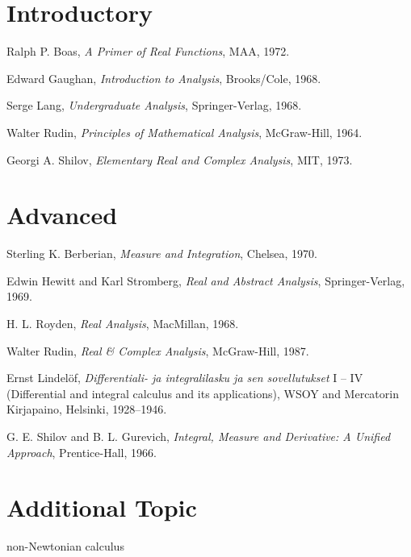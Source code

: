 \documentclass[12pt]{article}
\begin{document}
\section{Introductory}

Ralph P. Boas, {\em A Primer of Real Functions}, MAA, 1972.

Edward Gaughan, {\em Introduction to Analysis}, Brooks/Cole, 1968.

Serge Lang, {\em Undergraduate Analysis}, Springer-Verlag, 1968.

Walter Rudin, {\em Principles of Mathematical Analysis}, McGraw-Hill, 1964.

Georgi A. Shilov, {\em Elementary Real and Complex Analysis}, MIT, 1973.




\section{Advanced}

Sterling K. Berberian, {\em Measure and Integration}, Chelsea, 1970.

Edwin Hewitt and Karl Stromberg, {\em Real and Abstract Analysis}, Springer-Verlag, 1969.

H. L. Royden, {\em Real Analysis}, MacMillan, 1968.

Walter Rudin, {\em Real \& Complex Analysis}, McGraw-Hill, 1987.

Ernst Lindel\"of, {\em Differentiali- ja integralilasku ja sen sovellutukset} I -- IV (Differential and integral calculus and its applications), WSOY and Mercatorin Kirjapaino, Helsinki, 1928--1946.

G. E. Shilov and B. L. Gurevich, {\em Integral, Measure and Derivative: A Unified Approach}, Prentice-Hall, 1966.



\section{Additional Topic}

non-Newtonian calculus


\end{document}
